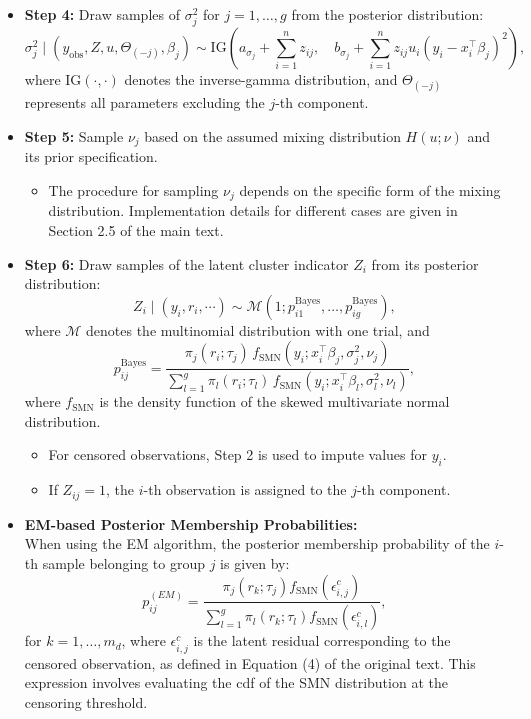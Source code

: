 \documentclass[10.5pt]{article} %
\begin{document}
\begin{itemize}
    \item \textbf{Step 4:} Draw samples of $\sigma_j^2$ for $j = 1, \dots, g$ from the posterior distribution:
    \[
    \sigma_j^2 \mid (y_{\text{obs}}, Z, u, \Theta_{(-j)}, \beta_j) \sim \text{IG} \left( a_{\sigma_j} + \sum_{i=1}^n z_{ij}, \quad b_{\sigma_j} + \sum_{i=1}^n z_{ij} u_i (y_i - x_i^\top \beta_j)^2 \right),
    \]
    where $\text{IG}(\cdot, \cdot)$ denotes the inverse-gamma distribution, and $\Theta_{(-j)}$ represents all parameters excluding the $j$-th component.

    \item \textbf{Step 5:} Sample $\nu_j$ based on the assumed mixing distribution $H(u; \nu)$ and its prior specification.
    \begin{itemize}
        \item The procedure for sampling $\nu_j$ depends on the specific form of the mixing distribution. Implementation details for different cases are given in Section 2.5 of the main text.
    \end{itemize}

    \item \textbf{Step 6:} Draw samples of the latent cluster indicator $Z_i$ from its posterior distribution:
    \[
    Z_i \mid (y_i, r_i, \cdots) \sim \mathcal{M}(1; p^{\text{Bayes}}_{i1}, \dots, p^{\text{Bayes}}_{ig}),
    \]
    where $\mathcal{M}$ denotes the multinomial distribution with one trial, and
    \[
    p^{\text{Bayes}}_{ij} = \frac{\pi_j(r_i; \tau_j) \, f_{\text{SMN}}(y_i; x_i^\top \beta_j, \sigma_j^2, \nu_j)}{\sum_{l=1}^g \pi_l(r_i; \tau_l) \, f_{\text{SMN}}(y_i; x_i^\top \beta_l, \sigma_l^2, \nu_l)},
    \]
    where $f_{\text{SMN}}$ is the density function of the skewed multivariate normal distribution.

    \begin{itemize}
        \item For censored observations, Step 2 is used to impute values for $y_i$.
        \item If $Z_{ij} = 1$, the $i$-th observation is assigned to the $j$-th component.
    \end{itemize}

    \item\textbf{EM-based Posterior Membership Probabilities:} \\
    When using the EM algorithm, the posterior membership probability of the $i$-th sample belonging to group $j$ is given by:
    \[
    p^{(EM)}_{ij} = \frac{\pi_j(r_k; \tau_j) f_{\text{SMN}}(\epsilon^{c}_{i,j})}{\sum_{l=1}^g \pi_l(r_k; \tau_l) f_{\text{SMN}}(\epsilon^{c}_{i,l})},
    \]
    for $k = 1, \dots, m_d$, where $\epsilon^{c}_{i,j}$ is the latent residual corresponding to the censored observation, as defined in Equation (4) of the original text. This expression involves evaluating the cdf of the SMN distribution at the censoring threshold.


\end{itemize}
\end{document}
